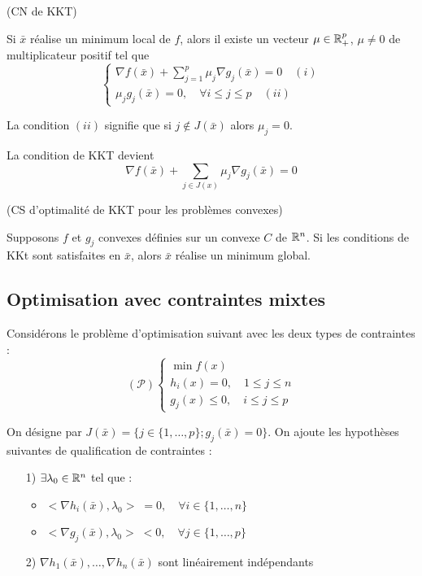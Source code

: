 \begin{theoreme} (CN de KKT)
	
	Si $\bar{x}$ réalise un minimum local de $f$, alors il existe un vecteur $\mu \in \mathbb{R}_+^p$, $\mu \ne 0$ de multiplicateur positif tel que \[ \begin{cases} \displaystyle \nabla f(\bar{x}) + \sum_{j=1}^p \mu _j \nabla g_j (\bar{x}) = 0 \quad (i) \\ \mu _j g_j(\bar{x}) = 0, \quad \forall i \leq j \leq p \quad (ii) \end{cases} \]
	
\end{theoreme}

\begin{remarque}
La condition $(ii)$ signifie que si $j \not \in J(\bar{x})$ alors $\mu_j = 0$.

La condition de KKT devient \[ \nabla f(\bar{x}) + \sum_{j \in J(x)} \mu _j \nabla g_j (\bar{x}) = 0 \]
\end{remarque}

\begin{theoreme} (CS d'optimalité de KKT pour les problèmes convexes)

Supposons $f$ et $g_j$ convexes définies sur un convexe $C$ de $\mathbb{R}^n$. Si les conditions de KKt sont satisfaites en $\bar{x}$, alors $\bar{x}$ réalise un minimum global.
\end{theoreme}

\subsection{Optimisation avec contraintes mixtes}

Considérons le problème d'optimisation suivant avec les deux types de contraintes : \[ (\mathcal{P}) \begin{cases}\min f(x) \\ h_i(x) = 0 , \quad 1 \leq j \leq n \\ g_j(x) \leq 0 , \quad i \leq j \leq p \end{cases} \]

On désigne par $J(\bar{x})=\{j \in \{1, \dots , p\}; g_j(\bar{x}) = 0\}$.
On ajoute les hypothèses suivantes de qualification de contraintes :
\begin{itemize}
	\item[1)] $\exists \lambda_0 \in \mathbb{R}^n$ tel que :
	\begin{itemize}
		\item $<\nabla h_i(\bar{x}), \lambda_0> \; = 0, \quad \forall i \in \{ 1, \dots , n \}$
		\item $<\nabla g_j(\bar{x}), \lambda_0> \; < 0, \quad \forall j \in \{ 1, \dots , p \}$
	\end{itemize}
	\item[2)] $\nabla h_1(\bar{x}), \dots, \nabla h_n(\bar{x})$ sont linéairement indépendants
\end{itemize}

